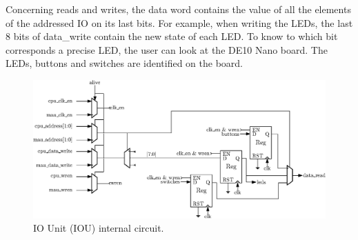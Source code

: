 Concerning reads and writes, the data word contains the value of all the elements of the addressed 
IO on its last bits. For example, when writing the LEDs, the last 8 bits of data\_write contain the 
new state of each LED. To know to which bit corresponds a precise LED, the user can look at the
DE10 Nano board. The LEDs, buttons and switches are identified on the board.

\begin{figure}[H]
    \centering
    \includegraphics[width=\linewidth]{Chapter3-CPU/res/iou_in}
    \caption{IO Unit (IOU) internal circuit.}
    \label{fig:iou/iou_in}
\end{figure}